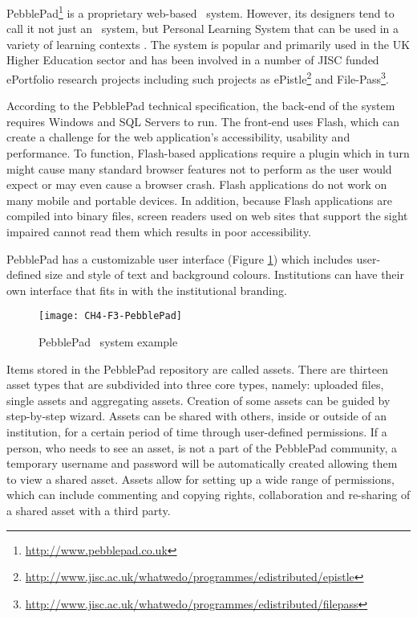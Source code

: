 PebblePad\footnote{\url{http://www.pebblepad.co.uk}} is a proprietary web-based
\ep~system. However, its designers tend to call it not just an \ep~system, but
Personal Learning System that can be used in a variety of learning contexts
\citep{PebbleLearningLtd2010}. The system is popular and primarily used in the
UK Higher Education sector and has been involved in a number of JISC funded
ePortfolio research projects including such projects as 
ePistle\footnote{\url{http://www.jisc.ac.uk/whatwedo/programmes/edistributed/epistle}}
and File-Pass\footnote{\url{http://www.jisc.ac.uk/whatwedo/programmes/edistributed/filepass}}.

According to the PebblePad technical specification, the back-end of the system
requires Windows and SQL Servers to run. The front-end uses Flash, which can
create a challenge for the web application's accessibility, usability and
performance. To function, Flash-based applications require a plugin which in
turn might cause many standard browser features not to perform as the user would
expect or may even cause a browser crash. Flash applications do not work on many
mobile and portable devices. In addition, because Flash applications are
compiled into binary files, screen readers used on web sites that support the
sight impaired cannot read them which results in poor accessibility.

PebblePad has a customizable user interface (Figure \ref{fig:ppep}) which
includes user-defined size and style of text and background colours.
Institutions can have their own interface that fits in with the institutional
branding.

\begin{figure}[htb]
\centering
\texttt{[image: CH4-F3-PebblePad]}
\caption[PebblePad \ep~system example]{PebblePad \ep~system example
\citep{PebbleLearningLtd}}
\label{fig:ppep}
\end{figure}

Items stored in the PebblePad repository are called assets. There are thirteen
asset types that are subdivided into three core types, namely: uploaded files,
single assets and aggregating assets. Creation of some assets can be guided by
step-by-step wizard. Assets can be shared with others, inside or outside of an
institution, for a certain period of time through user-defined permissions. If a
person, who needs to see an asset, is not a part of the PebblePad community, a
temporary username and password will be automatically created allowing them to
view a shared asset. Assets allow for setting up a wide range of permissions,
which can include commenting and copying rights, collaboration and re-sharing
of a shared asset with a third party.

